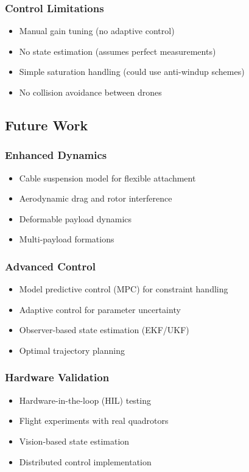 \documentclass[12pt,a4paper]{article}
\begin{document}
\subsubsection{Control Limitations}
\begin{itemize}
    \item Manual gain tuning (no adaptive control)
    \item No state estimation (assumes perfect measurements)
    \item Simple saturation handling (could use anti-windup schemes)
    \item No collision avoidance between drones
\end{itemize}

\subsection{Future Work}

\subsubsection{Enhanced Dynamics}
\begin{itemize}
    \item Cable suspension model for flexible attachment
    \item Aerodynamic drag and rotor interference
    \item Deformable payload dynamics
    \item Multi-payload formations
\end{itemize}

\subsubsection{Advanced Control}
\begin{itemize}
    \item Model predictive control (MPC) for constraint handling
    \item Adaptive control for parameter uncertainty
    \item Observer-based state estimation (EKF/UKF)
    \item Optimal trajectory planning
\end{itemize}

\subsubsection{Hardware Validation}
\begin{itemize}
    \item Hardware-in-the-loop (HIL) testing
    \item Flight experiments with real quadrotors
    \item Vision-based state estimation
    \item Distributed control implementation
\end{itemize}
\end{document}
